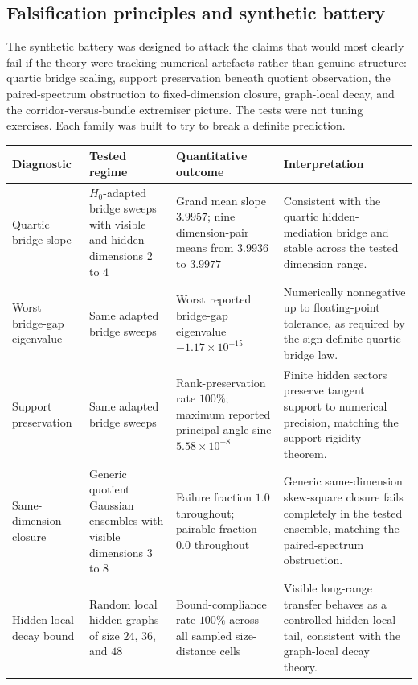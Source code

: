 \documentclass[11pt]{article}
\numberwithin{equation}{section}
\theoremstyle{thmcompact}
\theoremstyle{remark}
\begin{document}
\subsection{Falsification principles and synthetic battery}

The synthetic battery was designed to attack the claims that would most clearly fail if the theory were tracking numerical artefacts rather than genuine structure: quartic bridge scaling, support preservation beneath quotient observation, the paired-spectrum obstruction to fixed-dimension closure, graph-local decay, and the corridor-versus-bundle extremiser picture. The tests were not tuning exercises. Each family was built to try to break a definite prediction.

\begin{table}[H]
\centering
\begin{tabularx}{\textwidth}{>{\raggedright\arraybackslash}p{3.1cm} >{\raggedright\arraybackslash}p{4.0cm} Y Y}
\toprule
Diagnostic & Tested regime & Quantitative outcome & Interpretation\\
\midrule
Quartic bridge slope & $H_0$-adapted bridge sweeps with visible and hidden dimensions $2$ to $4$ & Grand mean slope $3.9957$; nine dimension-pair means from $3.9936$ to $3.9977$ & Consistent with the quartic hidden-mediation bridge and stable across the tested dimension range.\\
Worst bridge-gap eigenvalue & Same adapted bridge sweeps & Worst reported bridge-gap eigenvalue $-1.17\times 10^{-15}$ & Numerically nonnegative up to floating-point tolerance, as required by the sign-definite quartic bridge law.\\
Support preservation & Same adapted bridge sweeps & Rank-preservation rate $100\%$; maximum reported principal-angle sine $5.58\times 10^{-8}$ & Finite hidden sectors preserve tangent support to numerical precision, matching the support-rigidity theorem.\\
Same-dimension closure & Generic quotient Gaussian ensembles with visible dimensions $3$ to $8$ & Failure fraction $1.0$ throughout; pairable fraction $0.0$ throughout & Generic same-dimension skew-square closure fails completely in the tested ensemble, matching the paired-spectrum obstruction.\\
Hidden-local decay bound & Random local hidden graphs of size $24$, $36$, and $48$ & Bound-compliance rate $100\%$ across all sampled size-distance cells & Visible long-range transfer behaves as a controlled hidden-local tail, consistent with the graph-local decay theory.\\

\end{tabularx}
\end{table}
\end{document}
